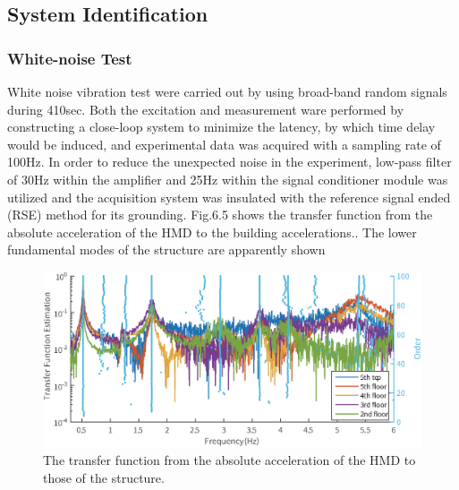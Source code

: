 \subsection{System Identification}
\subsubsection{White-noise Test}
White noise vibration test were carried out by using broad-band random signals during 410sec. Both the excitation and measurement ware performed by constructing a close-loop system to minimize the latency, by which time delay would be induced, and experimental data was acquired with a sampling rate of 100Hz. In order to reduce the unexpected noise in the experiment, low-pass filter of 30Hz within the amplifier and 25Hz within the signal conditioner module was utilized and the acquisition system was insulated with the reference signal ended (RSE) method for its grounding.
Fig.6.5 shows the transfer function from the absolute acceleration of the HMD to the building accelerations.. The lower fundamental modes of the structure are apparently shown

\begin{figure}[ht]
\centering
\includegraphics[width=1\textwidth] {figure/7-5.eps}
\caption{The transfer function from the absolute acceleration of the HMD to those of the structure.}
\label{fig:7-5}
\end{figure}


